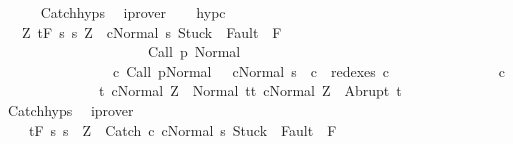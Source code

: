 \begin{isabellebody}
\ \ \ \ \isamarkupfalse%
\ Catch{\isachardot}hyps\ \isamarkupfalse%
\ iprover\isanewline
\ \ \isamarkupfalse%
\ hyp{\isacharunderscore}c{}{\isacharcolon}\isanewline
\ \ \ {\isachardoublequoteopen}{\isasymforall}Z{\isachardot}\ {\isasymGamma}{\isacharcomma}{\isasymTheta}{\isasymturnstile}\isactrlsub t\isactrlbsub {\isacharslash}F\isactrlesub \ {\isacharbraceleft}s{\isachardot}\ s{\isacharequal}\ Z\ {\isasymand}\ {\isasymGamma}{\isasymturnstile}{\isasymlangle}cNormal\ s{\isasymrangle}\ {\isasymRightarrow}{\isasymnotin}{\isacharparenleft}{\isacharbraceleft}Stuck{\isacharbraceright}\ {\isasymunion}\ Fault\ {\isacharbackquote}\ {\isacharparenleft}{\isacharminus}F{\isacharparenright}{\isacharparenright}\ {\isasymand}\ \isanewline
\ \ \ \ \ \ \ \ \ \ \ \ \ \ \ \ \ \ \ \ \ {\isasymGamma}{\isasymturnstile}Call\ p{\isasymdown}\ Normal\ {\isasymsigma}\ {\isasymand}\isanewline
\ \ \ \ \ \ \ \ \ \ \ \ \ \ \ \ {\isacharparenleft}{\isasymexists}c{\isacharprime}{\isachardot}\ {\isasymGamma}{\isasymturnstile}{\isacharparenleft}Call\ p{\isacharcomma}Normal\ {\isasymsigma}{\isacharparenright}\ {\isasymrightarrow}\isactrlsup {\isacharplus}\ {\isacharparenleft}c{\isacharprime}{\isacharcomma}Normal\ s{\isacharparenright}\ {\isasymand}\ c\ {\isasymin}\ redexes\ c{\isacharprime}{\isacharparenright}{\isacharbraceright}\isanewline
\ \ \ \ \ \ \ \ \ \ \ \ \ \ \ c\isanewline
\ \ \ \ \ \ \ \ \ \ \ \ \ \ {\isacharbraceleft}t{\isachardot}\ {\isasymGamma}{\isasymturnstile}{\isasymlangle}cNormal\ Z{\isasymrangle}\ {\isasymRightarrow}\ Normal\ t{\isacharbraceright}{\isacharcomma}{\isacharbraceleft}t{\isachardot}\ {\isasymGamma}{\isasymturnstile}{\isasymlangle}cNormal\ Z{\isasymrangle}\ {\isasymRightarrow}\ Abrupt\ t{\isacharbraceright}{\isachardoublequoteclose}\isanewline
\ \ \ \ \isamarkupfalse%
\ Catch{\isachardot}hyps\ \isamarkupfalse%
\ iprover\isanewline
\ \ \isamarkupfalse%
\isanewline
\ \ \ \ {\isachardoublequoteopen}{\isasymGamma}{\isacharcomma}{\isasymTheta}{\isasymturnstile}\isactrlsub t\isactrlbsub {\isacharslash}F\isactrlesub \ {\isacharbraceleft}s{\isachardot}\ s\ {\isacharequal}\ Z\ {\isasymand}\ {\isasymGamma}{\isasymturnstile}{\isasymlangle}Catch\ c\ cNormal\ s{\isasymrangle}\ {\isasymRightarrow}{\isasymnotin}{\isacharparenleft}{\isacharbraceleft}Stuck{\isacharbraceright}\ {\isasymunion}\ Fault\ {\isacharbackquote}\ {\isacharparenleft}{\isacharminus}F{\isacharparenright}{\isacharparenright}\ {\isasymand}\ \isanewline

\end{isabellebody}
